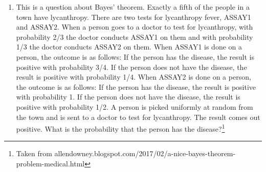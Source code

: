 \documentclass[11pt,a4paper]{scrartcl}
\newif\ifanswers
\begin{document}
\begin{enumerate}
\ifanswers
\textbf{Answer}:\\
  a) So there are 36 possible pairs of face values, each equally likes, of these 6+1, 5+2, 4+3, 3+4, 2+5 and 1+6 add to seven, so the probability of rolling a six is 1/6.\\
  b) win is 1/6+1/18 since there are two ways to may 11: 5+6 and 6+5, this is 4/18=2/9. lose is 1/36+1/18+1/36 which is 1/9 and by subraction this leave 2/3 as the chance of going on to the next phase of the game.
  c) So using Bayes rule
  $$P(4|4\|7)=\frac{P(4\|7|4)P(4)}{P(4\|7)}$$
  with $P(4)=3/36$ and $P(7)=6/36$ and $P(4\|7|4)=1$ hence
  $$P(4|4\|7)=3/(3+6)=1/3$$
  d) There are two ways of winning, either from the come out roll or a subsequent roll, which must be summed over the possible point values. 
  $$P(\mbox{first roll is 11 or seven})+\sum_{4,5,6,8,9,10} P_iQ_i=\frac{2}{9}+\sum_{4,5,6,8,9,10} P_iQ_i$$
  e) So
  $$\frac{2}{9}+\frac{1}{3}\frac{1}{12}+\frac{2}{5}\frac{1}{9}+\frac{5}{11}\frac{5}{36}+\frac{5}{11}\frac{5}{36}\frac{2}{5}\frac{1}{9}+\frac{1}{3}\frac{1}{12}\approx 0.49$$
  \fi

\item This is a question about Bayes' theorem.  Exactly a fifth of the
  people in a town have lycanthropy. There are two tests for
  lycanthropy fever, ASSAY1 and ASSAY2. When a person goes to a doctor
  to test for lycanthropy, with probability 2/3 the doctor conducts
  ASSAY1 on them and with probability 1/3 the doctor conducts ASSAY2
  on them. When ASSAY1 is done on a person, the outcome is as follows:
  If the person has the disease, the result is positive with
  probability 3/4. If the person does not have the disease, the result
  is positive with probability 1/4. When ASSAY2 is done on a person,
  the outcome is as follows: If the person has the disease, the result
  is positive with probability 1. If the person does not have the
  disease, the result is positive with probability 1/2. A person is
  picked uniformly at random from the town and is sent to a doctor to
  test for lycanthropy. The result comes out positive. What is the
  probability that the person has the disease?\footnote{Taken from allendowney.blogspot.com/2017/02/a-nice-bayes-theorem-problem-medical.html}


\end{enumerate}
\end{document}
